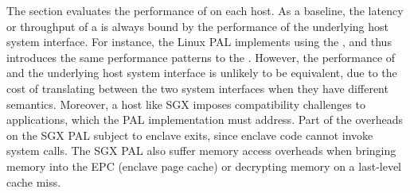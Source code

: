 

The section evaluates the performance of \thehostabi{}
on each host.
As a baseline, the latency or throughput
of a \hostapi{} is always bound by the performance of the underlying host system interface.
For instance, the Linux PAL implements 
using the  \linuxapi{},
and thus introduces the same performance
patterns to the \hostapi{}.
However, the performance of \thehostabi{} and the underlying host system interface
is unlikely to be equivalent,
due to the cost of translating between
the two system interfaces
when they have different semantics. 
Moreover, a host like SGX imposes compatibility challenges
to applications,
which the PAL implementation
must address.
Part of the overheads on the SGX PAL
subject to enclave exits,
since enclave code cannot invoke system calls.
The SGX PAL
also suffer memory access overheads
when bringing memory into the EPC (enclave page cache)
or decrypting memory
on a last-level cache miss.





